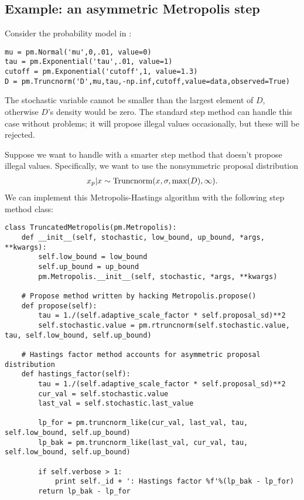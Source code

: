\hypertarget{custom_stepper_example}{}
\subsection*{Example: an asymmetric Metropolis step} \label{user-gen}
Consider the probability model in : 
\begin{verbatim}
mu = pm.Normal('mu',0,.01, value=0)
tau = pm.Exponential('tau',.01, value=1)
cutoff = pm.Exponential('cutoff',1, value=1.3)
D = pm.Truncnorm('D',mu,tau,-np.inf,cutoff,value=data,observed=True)
\end{verbatim}
The stochastic variable  cannot be smaller than the largest element of $D$, otherwise $D$'s density would be zero. The standard  step method can handle this case without problems; it will propose illegal values occasionally, but these will be rejected. 

\medskip
Suppose we want to handle  with a smarter step method that doesn't propose illegal values. Specifically, we want to use the nonsymmetric proposal distribution
\begin{eqnarray*}
	x_p | x \sim \textup{Truncnorm}(x, \sigma, \max(D), \infty).
\end{eqnarray*}
We can implement this Metropolis-Hastings algorithm with the following step method class:
\begin{verbatim}
class TruncatedMetropolis(pm.Metropolis):
    def __init__(self, stochastic, low_bound, up_bound, *args, **kwargs):
        self.low_bound = low_bound
        self.up_bound = up_bound
        pm.Metropolis.__init__(self, stochastic, *args, **kwargs)

    # Propose method written by hacking Metropolis.propose()
    def propose(self):
        tau = 1./(self.adaptive_scale_factor * self.proposal_sd)**2
        self.stochastic.value = pm.rtruncnorm(self.stochastic.value, tau, self.low_bound, self.up_bound)

    # Hastings factor method accounts for asymmetric proposal distribution    
    def hastings_factor(self):
        tau = 1./(self.adaptive_scale_factor * self.proposal_sd)**2
        cur_val = self.stochastic.value
        last_val = self.stochastic.last_value

        lp_for = pm.truncnorm_like(cur_val, last_val, tau, self.low_bound, self.up_bound)
        lp_bak = pm.truncnorm_like(last_val, cur_val, tau, self.low_bound, self.up_bound)   

        if self.verbose > 1:
            print self._id + ': Hastings factor %f'%(lp_bak - lp_for)     
        return lp_bak - lp_for
\end{verbatim}

